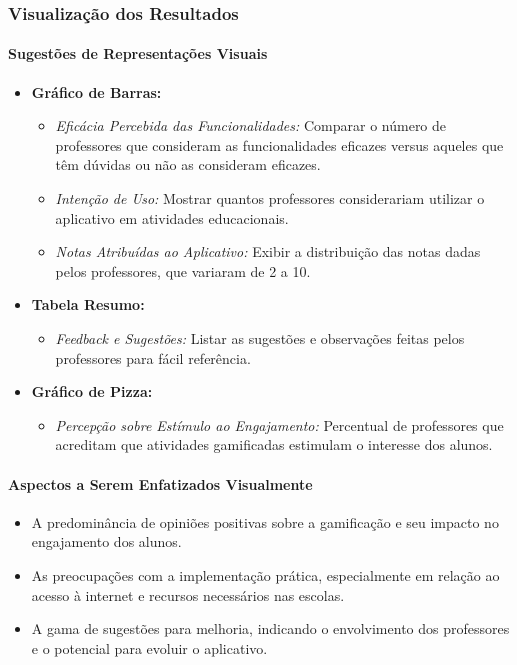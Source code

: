 \subsubsection{Visualização dos Resultados}

\paragraph{Sugestões de Representações Visuais}

\begin{itemize}
    \item \textbf{Gráfico de Barras:}
    \begin{itemize}
        \item \textit{Eficácia Percebida das Funcionalidades:} Comparar o número de professores que consideram as funcionalidades eficazes versus aqueles que têm dúvidas ou não as consideram eficazes.
        \item \textit{Intenção de Uso:} Mostrar quantos professores considerariam utilizar o aplicativo em atividades educacionais.
        \item \textit{Notas Atribuídas ao Aplicativo:} Exibir a distribuição das notas dadas pelos professores, que variaram de 2 a 10.
    \end{itemize}
    \item \textbf{Tabela Resumo:}
    \begin{itemize}
        \item \textit{Feedback e Sugestões:} Listar as sugestões e observações feitas pelos professores para fácil referência.
    \end{itemize}
    \item \textbf{Gráfico de Pizza:}
    \begin{itemize}
        \item \textit{Percepção sobre Estímulo ao Engajamento:} Percentual de professores que acreditam que atividades gamificadas estimulam o interesse dos alunos.
    \end{itemize}
\end{itemize}

\paragraph{Aspectos a Serem Enfatizados Visualmente}

\begin{itemize}
    \item A predominância de opiniões positivas sobre a gamificação e seu impacto no engajamento dos alunos.
    \item As preocupações com a implementação prática, especialmente em relação ao acesso à internet e recursos necessários nas escolas.
    \item A gama de sugestões para melhoria, indicando o envolvimento dos professores e o potencial para evoluir o aplicativo.
\end{itemize}

